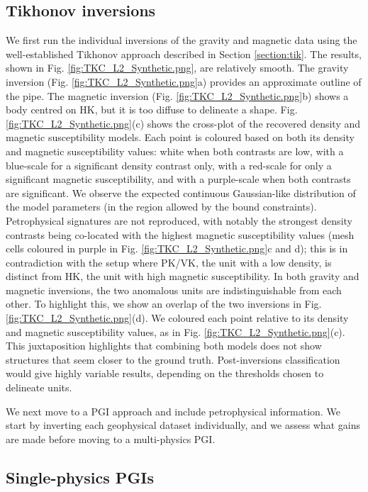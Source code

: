 \documentclass[extra, mreferee]{gji_joint} %
\begin{document}
\subsection{Tikhonov inversions}

We first run the individual inversions of the gravity and magnetic data using the well-established Tikhonov approach described in Section \ref{section:tik}. The results, shown in Fig. \ref{fig:TKC_L2_Synthetic.png}, are relatively smooth. The gravity inversion (Fig. \ref{fig:TKC_L2_Synthetic.png}a) provides an approximate outline of the pipe. The magnetic inversion (Fig. \ref{fig:TKC_L2_Synthetic.png}b) shows a body centred on HK, but it is too diffuse to delineate a shape. Fig. \ref{fig:TKC_L2_Synthetic.png}(c) shows the cross-plot of the recovered density and magnetic susceptibility models. Each point is coloured based on both its density and magnetic susceptibility values: white when both contrasts are low, with a blue-scale for a significant density contrast only, with a red-scale for only a significant magnetic susceptibility, and with a purple-scale when both contrasts are significant. We observe the expected continuous Gaussian-like distribution of the model parameters (in the region allowed by the bound constraints). Petrophysical signatures are not reproduced, with notably the strongest density contrasts being co-located with the highest magnetic susceptibility values (mesh cells coloured in purple in Fig. \ref{fig:TKC_L2_Synthetic.png}c and d); this is in contradiction with the setup where PK/VK, the unit with a low density, is distinct from HK, the unit with high magnetic susceptibility. In both gravity and magnetic inversions, the two anomalous units are indistinguishable from each other. To highlight this, we show an overlap of the two inversions in Fig. \ref{fig:TKC_L2_Synthetic.png}(d). We coloured each point relative to its density and magnetic susceptibility values, as in Fig. \ref{fig:TKC_L2_Synthetic.png}(c). This juxtaposition highlights that combining both models does not show structures that seem closer to the ground truth. Post-inversions classification would give highly variable results, depending on the thresholds chosen to delineate units.

We next move to a PGI approach and include petrophysical information. We start by inverting each geophysical dataset individually, and we assess what gains are made before moving to a multi-physics PGI.

\subsection{Single-physics PGIs}
\end{document}
